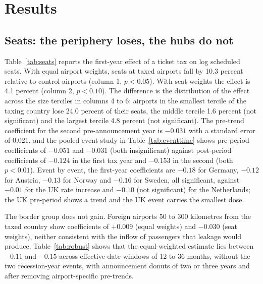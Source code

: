 
\section{Results}
\label{sec:results}

\subsection{Seats: the periphery loses, the hubs do not}

Table~\ref{tab:seats} reports the first-year effect of a ticket tax on log scheduled seats. With equal
airport weights, seats at taxed airports fall by 10.3 percent relative to control airports (column 1,
$p<0.05$). With seat weights the effect is 4.1 percent (column 2, $p<0.10$). The difference is the
distribution of the effect across the size terciles in columns 4 to 6: airports in the smallest tercile of
the taxing country lose 24.0 percent of their seats, the middle tercile 1.6 percent (not significant)
and the largest tercile 4.8 percent (not significant). The pre-trend coefficient for the second
pre-announcement year is $-0.031$ with a standard error of 0.021, and the pooled event study in
Table~\ref{tab:eventtime} shows pre-period coefficients of $-0.051$ and $-0.031$ (both insignificant)
against post-period coefficients of $-0.124$ in the first tax year and $-0.153$ in the second (both
$p<0.01$). Event by event, the first-year coefficients are $-0.18$ for Germany, $-0.12$ for Austria,
$-0.13$ for Norway and $-0.16$ for Sweden, all significant, against $-0.01$ for the UK rate increase and
$-0.10$ (not significant) for the Netherlands; the UK pre-period shows a trend and the UK event carries
the smallest dose.

The border group does not gain. Foreign airports 50 to 300 kilometres from the taxed country show
coefficients of $+0.009$ (equal weights) and $-0.030$ (seat weights), neither consistent with the
inflow of passengers that leakage would produce. Table~\ref{tab:robust} shows that the equal-weighted
estimate lies between $-0.11$ and $-0.15$ across effective-date windows of 12 to 36 months, without the
two recession-year events, with announcement donuts of two or three years and after removing
airport-specific pre-trends.

